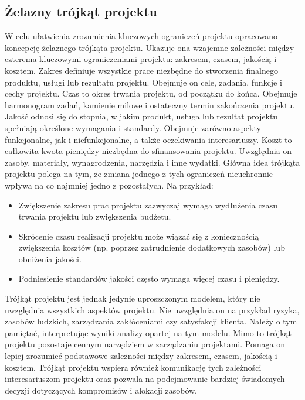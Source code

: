 \subsection{Żelazny trójkąt projektu}
W celu ułatwienia zrozumienia kluczowych ograniczeń projektu opracowano koncepcję żelaznego trójkąta projektu. Ukazuje ona wzajemne zależności między czterema kluczowymi ograniczeniami projektu: zakresem, czasem, jakością i kosztem. \autocite{triangle} \autocite{challanges}
Zakres definiuje wszystkie prace niezbędne do stworzenia finalnego produktu, usługi lub rezultatu projektu. Obejmuje on cele, zadania, funkcje i cechy projektu. \autocite{triangle2}
Czas to okres trwania projektu, od początku do końca. Obejmuje harmonogram zadań, kamienie milowe i ostateczny termin zakończenia projektu.
Jakość odnosi się do stopnia, w jakim produkt, usługa lub rezultat projektu spełniają określone wymagania i standardy. Obejmuje zarówno aspekty funkcjonalne, jak i niefunkcjonalne, a także oczekiwania interesariuszy.
Koszt to całkowita kwota pieniędzy niezbędna do sfinansowania projektu. Uwzględnia on zasoby, materiały, wynagrodzenia, narzędzia i inne wydatki.
Główna idea trójkąta projektu polega na tym, że zmiana jednego z tych ograniczeń nieuchronnie wpływa na co najmniej jedno z pozostałych.
Na przykład:
\begin{itemize}
    \item Zwiększenie zakresu prac projektu zazwyczaj wymaga wydłużenia czasu trwania projektu lub zwiększenia budżetu.
    \item Skrócenie czasu realizacji projektu może wiązać się z koniecznością zwiększenia kosztów (np. poprzez zatrudnienie dodatkowych zasobów) lub obniżenia jakości.
    \item Podniesienie standardów jakości często wymaga więcej czasu i pieniędzy.
\end{itemize}
Trójkąt projektu jest jednak jedynie uproszczonym modelem, który nie uwzględnia wszystkich aspektów projektu. Nie uwzględnia on na przykład ryzyka, zasobów ludzkich, zarządzania zakłóceniami czy satysfakcji klienta. Należy o tym pamiętać, interpretując wyniki analizy opartej na tym modelu.
Mimo to trójkąt projektu pozostaje cennym narzędziem w zarządzaniu projektami. Pomaga on lepiej zrozumieć podstawowe zależności między zakresem, czasem, jakością i kosztem. Trójkąt projektu wspiera również komunikację tych zależności interesariuszom projektu oraz pozwala na podejmowanie bardziej świadomych decyzji dotyczących kompromisów i alokacji zasobów.

